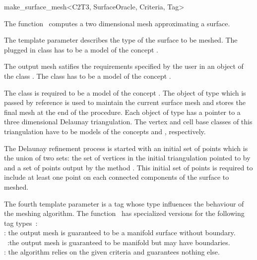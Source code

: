 

\begin{ccRefFunction}{make_surface_mesh<C2T3, SurfaceOracle,
Criteria, Tag>}  %


\ccDefinition
  
The function \ccRefName\ computes a two dimensional mesh 
approximating  a surface.

The template parameter  describes the type of the 
surface  to be meshed. 
The plugged in class 
has to be a model of the concept .

The output mesh satifies the requirements specified by the user
in an object of the class .
The class  has to be
a model of the concept .

 The class 
is required to be a model of the concept
.
The object  of type  which is passed by reference
is used to maintain  the current surface mesh and stores
the final mesh at the end of the procedure.
Each object of type  has a pointer to 
a three dimensional  Delaunay triangulation.
The vertex and cell base classes of this triangulation
have  to be  models  of the concepts 
 and 
, respectively.

The Delaunay refinement
process is started with an initial set of points which is the union 
of two sets: the
set of vertices in the initial  triangulation pointed to by 
 and a set of
points output by the method .
This initial set of points is required to include at least one point
on each connected components of the surface to meshed.

The fourth template parameter is a tag whose type influences the behaviour of the
meshing algorithm. The function \ccRefName\  has specialized versions
for the following  tag types~: \\
: the output mesh is guaranteed to be a manifold
surface without boundary.\\
~:the output mesh is guaranteed to be
manifold but may have boundaries.\\
 : the algorithm relies on the given criteria and
guarantees nothing else.




\end{ccRefFunction}
